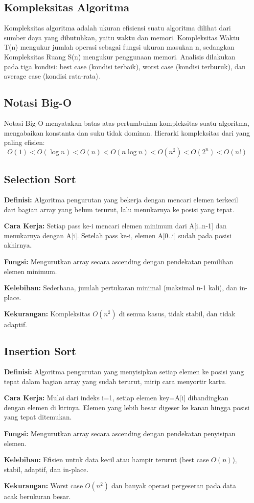 \subsection{Kompleksitas Algoritma}
Kompleksitas algoritma adalah ukuran efisiensi suatu algoritma dilihat dari sumber daya yang dibutuhkan, yaitu waktu dan memori. Kompleksitas Waktu T(n) mengukur jumlah operasi sebagai fungsi ukuran masukan n, sedangkan Kompleksitas Ruang S(n) mengukur penggunaan memori. Analisis dilakukan pada tiga kondisi: best case (kondisi terbaik), worst case (kondisi terburuk), dan average case (kondisi rata-rata).

\subsection{Notasi Big-O}
Notasi Big-O menyatakan batas atas pertumbuhan kompleksitas suatu algoritma, mengabaikan konstanta dan suku tidak dominan. Hierarki kompleksitas dari yang paling efisien:
\[ O(1) < O(\log n) < O(n) < O(n \log n) < O(n^2) < O(2^n) < O(n!) \]

\subsection{Selection Sort}
\textbf{Definisi:} Algoritma pengurutan yang bekerja dengan mencari elemen terkecil dari bagian array yang belum terurut, lalu menukarnya ke posisi yang tepat.

\textbf{Cara Kerja:} Setiap pass ke-i mencari elemen minimum dari A[i..n-1] dan menukarnya dengan A[i]. Setelah pass ke-i, elemen A[0..i] sudah pada posisi akhirnya.

\textbf{Fungsi:} Mengurutkan array secara ascending dengan pendekatan pemilihan elemen minimum.

\textbf{Kelebihan:} Sederhana, jumlah pertukaran minimal (maksimal n-1 kali), dan in-place.

\textbf{Kekurangan:} Kompleksitas $O(n^2)$ di semua kasus, tidak stabil, dan tidak adaptif.

\subsection{Insertion Sort}
\textbf{Definisi:} Algoritma pengurutan yang menyisipkan setiap elemen ke posisi yang tepat dalam bagian array yang sudah terurut, mirip cara menyortir kartu.

\textbf{Cara Kerja:} Mulai dari indeks i=1, setiap elemen key=A[i] dibandingkan dengan elemen di kirinya. Elemen yang lebih besar digeser ke kanan hingga posisi yang tepat ditemukan.

\textbf{Fungsi:} Mengurutkan array secara ascending dengan pendekatan penyisipan elemen.

\textbf{Kelebihan:} Efisien untuk data kecil atau hampir terurut (best case $O(n)$), stabil, adaptif, dan in-place.

\textbf{Kekurangan:} Worst case $O(n^2)$ dan banyak operasi pergeseran pada data acak berukuran besar.
